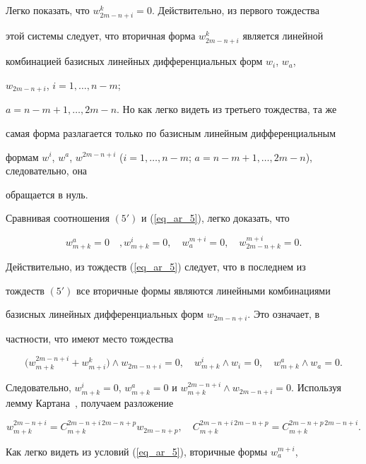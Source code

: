 Легко показать, что $w^k_{2m-n+i}=0$. Действительно, из первого тождества


этой системы следует, что вторичная форма $w^k_{2m-n+i}$ является линейной


комбинацией базисных линейных дифференциальных форм $w_i$, $w_a$,


$w_{2m-n+i}$, $i=1, \dotsc, n-m$;


$a=n-m+1, \dotsc, 2m-n$. Но как легко видеть из третьего тождества, та же


самая форма разлагается только по базисным линейным дифференциальным


формам $w^i$, $w^a$, $w^{2m-n+i}$ ($i=1, \dotsc, n - m$; $a=n -m+1,


\dotsc, 2m -n$), следовательно, она


обращается в нуль.





Сравнивая соотношения $(5')$ и (\ref{eq_ar_5}), легко доказать, что


$$


w^a_{m+k}=0\quad, w^i_{m+k}=0,\quad w^{m+i}_a=0,\quad w^{m+i}_{2m-n+k}=0.


$$


Действительно, из тождеств (\ref{eq_ar_5}) следует, что в последнем из


тождеств $(5')$ все вторичные формы являются линейными комбинациями


базисных линейных дифференциальных форм $w_{2m-n+i}$. Это означает, в


частности, что имеют место тождества


$$


\big(w_{m+k}^{2m-n+i}+w^k_{m+i}\big)\wedge w_{2m-n+i}=0,\quad


w^i_{m+k}\wedge w_i=0, \quad w^a_{m+k}\wedge w_a=0.


$$


Следовательно, $w^i_{m+k}=0$, $w^a_{m+k}=0$ и $w_{m+k}^{2m-n+i}\wedge


w_{2m-n+i}=0$. Используя лемму Картана~\cite{ar5}, получаем разложение


$$


w_{m+k}^{2m-n+i}=C^{2m-n+i\, 2m-n+p}_{m+k}w_{2m-n+p},\quad


C^{2m-n+i\, 2m-n+p}_{m+k}=C^{2m-n+p\, 2m-n+i}_{m+k}.


$$


Как легко видеть из условий (\ref{eq_ar_5}), вторичные формы $w^{m+i}_a$,


